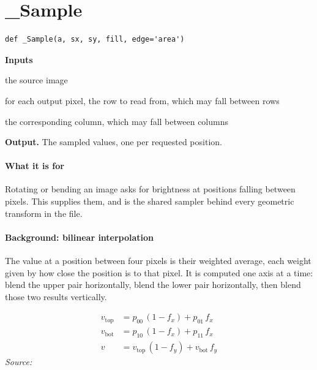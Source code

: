 \section{\_Sample}
\begin{lstlisting}[style=sig]
def _Sample(a, sx, sy, fill, edge='area')
\end{lstlisting}

\noindent\textbf{Inputs}
\begin{description}[leftmargin=2.2em,style=nextline,font=\normalfont\ttfamily]\setlength\itemsep{1pt}
  \item[{img}] \normalfont the source image
  \item[{sy}] \normalfont for each output pixel, the row to read from, which may fall between rows
  \item[{sx}] \normalfont the corresponding column, which may fall between columns
\end{description}

\noindent\textbf{Output.} The sampled values, one per requested position.


\paragraph{What it is for}
Rotating or bending an image asks for brightness at positions falling between pixels. This supplies them, and is the shared sampler behind every geometric transform in the file.


\paragraph{Background: bilinear interpolation}
The value at a position between four pixels is their weighted average, each weight given by how close the position is to that pixel. It is computed one axis at a time: blend the upper pair horizontally, blend the lower pair horizontally, then blend those two results vertically.


\begin{equation}
\begin{aligned}v_{\mathrm{top}} &= p_{00}\,(1-f_x) + p_{01}\, f_x \\[2pt]v_{\mathrm{bot}} &= p_{10}\,(1-f_x) + p_{11}\, f_x \\[2pt]v &= v_{\mathrm{top}}\,(1-f_y) + v_{\mathrm{bot}}\, f_y\end{aligned}
\end{equation}
\noindent\emph{Source: }\cite{wolberg1990}


